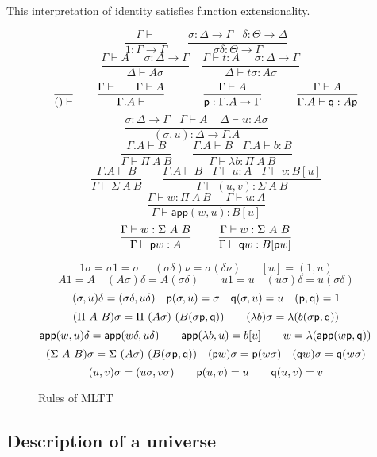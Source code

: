 \documentclass[10pt,a4paper]{article}
\newcommand{\app}{\mathsf{app}}
\newcommand{\pp}{{\sf p}}
\newcommand{\qq}{{\sf q}}
\begin{document}
\medskip

This interpretation of identity satisfies function extensionality.

\begin{figure}[t]
\caption{Rules of MLTT\label{MLTT}}
\centering
$$
\frac{\Gamma\vdash}{1:\Gamma\to \Gamma}~~~~~~~~
\frac{\sigma:\Delta\to\Gamma~~~~\delta:\Theta\to\Delta}
     {\sigma\delta:\Theta\to\Gamma}
$$
$$
\frac{\Gamma\vdash A~~~~~~\sigma:\Delta\to\Gamma}{\Delta\vdash A\sigma}~~~~~
\frac{\Gamma\vdash t:A~~~~~~\sigma:\Delta\to\Gamma}{\Delta\vdash t\sigma:A\sigma}~~~~~
$$
$$
\frac{}{()\vdash}~~~~~~
\frac{\Gamma\vdash~~~~~\Gamma\vdash A}{\Gamma.A\vdash}~~~~~~~~~~
\frac{\Gamma\vdash A}{\pp:\Gamma.A\to\Gamma}~~~~~~~~~
\frac{\Gamma\vdash A}{\Gamma.A\vdash \qq:A\pp}
$$
$$
\frac{\sigma:\Delta\to\Gamma~~~~\Gamma\vdash A~~~~~\Delta\vdash u:A\sigma}
     {(\sigma,u):\Delta\to\Gamma.A}~~~~~~~~
$$
$$
\frac{\Gamma.A\vdash B}{\Gamma\vdash\Pi~A~B}~~~~~~~~
\frac{\Gamma.A\vdash B~~~~\Gamma.A\vdash b:B}
     {\Gamma\vdash\lambda b:\Pi~A~B}
$$
$$
\frac{\Gamma.A\vdash B}{\Gamma\vdash\Sigma~A~B}~~~~~~~~
\frac{\Gamma.A\vdash B~~~~\Gamma\vdash u:A~~~~\Gamma\vdash v:B[u]}
     {\Gamma\vdash (u,v):\Sigma~A~B}
$$
$$
\frac{\Gamma\vdash w:\Pi~A~B~~~~~~\Gamma\vdash u:A}
     {\Gamma\vdash \app(w,u):B[u]}
$$
$$
\frac{\Gamma\vdash w:\Sigma~A~B}{\Gamma\vdash \pp w : A}~~~~~~~
\frac{\Gamma\vdash w:\Sigma~A~B}{\Gamma\vdash \qq w : B[\pp w]}
$$


\medskip

$$
{1\sigma = \sigma 1 = \sigma}~~~~~~{(\sigma\delta)\nu = \sigma(\delta\nu)}~~~~~~~~[u] = (1,u)
$$
$$
{A 1 = A \quad (A \sigma) \delta = A (\sigma \delta) \qquad  u 1 = u \quad
(u \sigma) \delta = u (\sigma \delta)}
$$
$$
{(\sigma,u)\delta = (\sigma\delta,u\delta)} \quad {\pp (\sigma,u) =
  \sigma} \quad {\qq(\sigma,u) = u} \quad (\pp, \qq) = 1
$$
$$
{(\Pi~A~B)\sigma = \Pi~(A\sigma)~(B(\sigma\pp,\qq))} \qquad
{(\lambda b) \sigma = \lambda (b (\sigma \pp, \qq))}
$$
$$
     {\app(w,u)\delta= \app(w\delta,u\delta)}\qquad
     {\app(\lambda b,u)= b[u]}\qquad
     {w = \lambda (\app(w \pp, \qq))} \qquad
$$
$$
(\Sigma~A~B)\sigma = \Sigma~(A\sigma)~(B(\sigma\pp,\qq)) \quad (\pp w)
\sigma = \pp (w \sigma) \quad (\qq w) \sigma = \qq (w \sigma)
$$
$$
(u, v) \sigma = (u \sigma, v \sigma) \qquad\pp (u,v) = u \qquad \qq
(u,v) = v
$$
\end{figure}

\subsection{Description of a universe}
\end{document}
